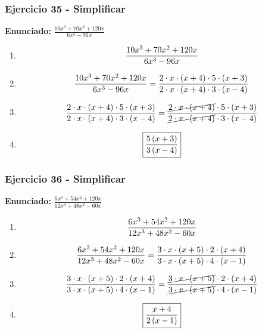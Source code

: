 \documentclass[11pt,a4paper]{article}
\newcommand{\fitmath}[1]{%
\[
\setbox0=\hbox{$\displaystyle #1$}%
\ifdim\wd0>\linewidth
\resizebox{\linewidth}{!}{$\displaystyle #1$}%
\else
#1%
\fi
\]
}
\begin{document}
\vspace{0.12cm}
\subsubsection*{Ejercicio 35 - Simplificar}
\textbf{Enunciado:} $ \frac{10 x^{3} + 70 x^{2} + 120 x}{6 x^{3} - 96 x} $\par
\begin{enumerate}[leftmargin=2em]
\item \fitmath{\frac{10 x^{3} + 70 x^{2} + 120 x}{6 x^{3} - 96 x}}
\item \fitmath{\frac{10 x^{3} + 70 x^{2} + 120 x}{6 x^{3} - 96 x}=\frac{2\cdot x\cdot \left(x + 4\right)\cdot 5\cdot \left(x + 3\right)}{2\cdot x\cdot \left(x + 4\right)\cdot 3\cdot \left(x - 4\right)}}
\item \fitmath{\frac{2\cdot x\cdot \left(x + 4\right)\cdot 5\cdot \left(x + 3\right)}{2\cdot x\cdot \left(x + 4\right)\cdot 3\cdot \left(x - 4\right)}=\frac{\cancel{2\cdot x\cdot \left(x + 4\right)}\cdot 5\cdot \left(x + 3\right)}{\cancel{2\cdot x\cdot \left(x + 4\right)}\cdot 3\cdot \left(x - 4\right)}}
\item \fitmath{\boxed{\frac{5 \left(x + 3\right)}{3 \left(x - 4\right)}}}
\end{enumerate}

\vspace{0.12cm}
\subsubsection*{Ejercicio 36 - Simplificar}
\textbf{Enunciado:} $ \frac{6 x^{3} + 54 x^{2} + 120 x}{12 x^{3} + 48 x^{2} - 60 x} $\par
\begin{enumerate}[leftmargin=2em]
\item \fitmath{\frac{6 x^{3} + 54 x^{2} + 120 x}{12 x^{3} + 48 x^{2} - 60 x}}
\item \fitmath{\frac{6 x^{3} + 54 x^{2} + 120 x}{12 x^{3} + 48 x^{2} - 60 x}=\frac{3\cdot x\cdot \left(x + 5\right)\cdot 2\cdot \left(x + 4\right)}{3\cdot x\cdot \left(x + 5\right)\cdot 4\cdot \left(x - 1\right)}}
\item \fitmath{\frac{3\cdot x\cdot \left(x + 5\right)\cdot 2\cdot \left(x + 4\right)}{3\cdot x\cdot \left(x + 5\right)\cdot 4\cdot \left(x - 1\right)}=\frac{\cancel{3\cdot x\cdot \left(x + 5\right)}\cdot 2\cdot \left(x + 4\right)}{\cancel{3\cdot x\cdot \left(x + 5\right)}\cdot 4\cdot \left(x - 1\right)}}
\item \fitmath{\boxed{\frac{x + 4}{2 \left(x - 1\right)}}}
\end{enumerate}
\end{document}
